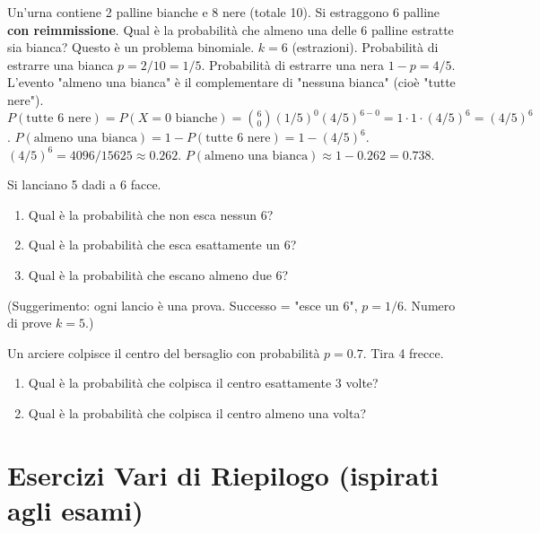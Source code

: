 \begin{example}
Un'urna contiene 2 palline bianche e 8 nere (totale 10). Si estraggono 6 palline \textbf{con reimmissione}.
Qual è la probabilità che almeno una delle 6 palline estratte sia bianca?
Questo è un problema binomiale. $k=6$ (estrazioni).
Probabilità di estrarre una bianca $p = 2/10 = 1/5$.
Probabilità di estrarre una nera $1-p = 4/5$.
L'evento "almeno una bianca" è il complementare di "nessuna bianca" (cioè "tutte nere").
$P(\text{tutte 6 nere}) = P(X=0 \text{ bianche}) = \binom{6}{0} (1/5)^0 (4/5)^{6-0} = 1 \cdot 1 \cdot (4/5)^6 = (4/5)^6$.
$P(\text{almeno una bianca}) = 1 - P(\text{tutte 6 nere}) = 1 - (4/5)^6$.
$(4/5)^6 = 4096 / 15625 \approx 0.262$.
$P(\text{almeno una bianca}) \approx 1 - 0.262 = 0.738$.
\end{example}

\begin{exercise}
Si lanciano 5 dadi a 6 facce.
\begin{enumerate}
    \item Qual è la probabilità che non esca nessun 6?
    \item Qual è la probabilità che esca esattamente un 6?
    \item Qual è la probabilità che escano almeno due 6?
\end{enumerate}
(Suggerimento: ogni lancio è una prova. Successo = "esce un 6", $p=1/6$. Numero di prove $k=5$.)
\end{exercise}

\begin{exercise}[Bersaglio]
Un arciere colpisce il centro del bersaglio con probabilità $p=0.7$. Tira 4 frecce.
\begin{enumerate}
    \item Qual è la probabilità che colpisca il centro esattamente 3 volte?
    \item Qual è la probabilità che colpisca il centro almeno una volta?
\end{enumerate}
\end{exercise}

\section{Esercizi Vari di Riepilogo (ispirati agli esami)}

